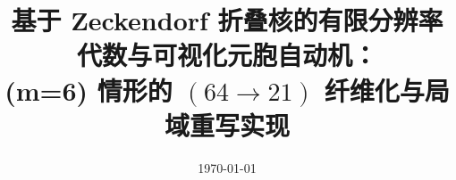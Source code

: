 \documentclass[11pt,letterpaper]{ctexart}
\title{基于 Zeckendorf 折叠核的有限分辨率代数与可视化元胞自动机：\\(m=6) 情形的 $(64\to 21)$ 纤维化与局域重写实现}
\author{}
\date{\today}
\begin{document}
\maketitle












\FloatBarrier
\appendix


\FloatBarrier

\end{document}
